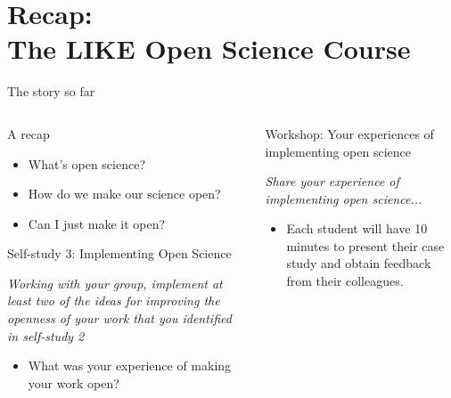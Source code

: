 \section[The course]{Recap:\\ The LIKE Open Science Course}
\label{sec:course}

\begin{frame}{The story so far}

\begin{columns}[c]
    \begin{column}{.45\textwidth}

        \begin{block}{A recap}
            \begin{itemize}
                \item What's open science?
                \item How do we make our science open?
                \item Can I just make it open?
            \end{itemize}
        \end{block}
    
        \pause
    
        \begin{block}{Self-study 3: Implementing Open Science}
        
            \textit{Working with your group, implement at least two of the ideas for improving the openness of your work that you identified in self-study 2}

            \begin{itemize}
                \item What was your experience of making your work open?
            \end{itemize}

        \end{block}

    \end{column}

    \begin{column}{.45\textwidth}

        \begin{block}{Workshop: Your experiences of implementing open science}
        
            \textit{Share your experience of implementing open science... }

            \begin{itemize}
                \item Each student will have 10 minutes to present their case study and obtain feedback from their colleagues.
            \end{itemize}
        \end{block}

    \end{column}

\end{columns}


\end{frame}


